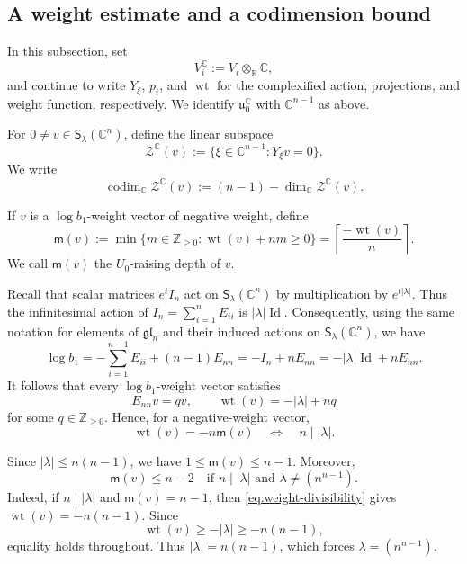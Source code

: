 \documentclass[reqno,11pt]{amsart}
\numberwithin{equation}{section}
\theoremstyle{definition}
\theoremstyle{remark}
\begin{document}
\subsection{A weight estimate and a codimension bound}
\label{s:parabolic-codim}
In this subsection, set
\[
V_i^{\mathbb C}:=V_i\otimes_{\mathbb R}\mathbb C,
\]
and continue to write $Y_\xi$, $p_i$, and $\operatorname{wt}$ for the
complexified action, projections, and weight function, respectively.
We identify
$\mathfrak u_0^{\mathbb C}$ with $\mathbb C^{n-1}$ as above.

For $0\ne v\in\mathsf S_\lambda(\mathbb C^n)$, define the linear
subspace
$$
\mathcal Z^{\mathbb C}(v)
:=
\{\xi\in\mathbb C^{n-1}:Y_\xi v=0\}.
$$
We write
$$
\operatorname{codim}_{\mathbb C}\mathcal Z^{\mathbb C}(v)
:=
(n-1)-\dim_{\mathbb C}\mathcal Z^{\mathbb C}(v).
$$

If $v$ is a $\log b_1$-weight vector of negative weight, define
\begin{equation}\label{eq:def-mv}
\mathsf m(v)
:=
\min\bigl\{m\in\mathbb Z_{\ge0}:
\operatorname{wt}(v)+nm\ge0\bigr\}
=
\left\lceil\frac{-\operatorname{wt}(v)}{n}\right\rceil.
\end{equation}
We call $\mathsf m(v)$ the $U_0$-raising depth of $v$.

Recall that scalar matrices $e^tI_n$ act on
$\mathsf S_\lambda(\mathbb C^n)$ by multiplication by
$e^{t|\lambda|}$. Thus the infinitesimal action of
$I_n=\sum_{i=1}^nE_{ii}
$
is $|\lambda|\operatorname{Id}$. Consequently, using the same notation
for elements of $\mathfrak{gl}_n$ and their induced actions on
$\mathsf S_\lambda(\mathbb C^n)$, we have
$$
\log b_1
=
-\sum_{i=1}^{n-1}E_{ii}+(n-1)E_{nn}
= -I_n + n E_{nn}=
-|\lambda|\operatorname{Id}+nE_{nn}.
$$
It follows that every $\log b_1$-weight vector satisfies
$$
E_{nn}v=qv,
\qquad
\operatorname{wt}(v)=-|\lambda|+nq
$$
for some $q\in\mathbb Z_{\ge0}$. Hence, for a negative-weight vector,
\begin{equation}\label{eq:weight-divisibility}
\operatorname{wt}(v)=-n\mathsf m(v)
\quad\Longleftrightarrow\quad
n\mid|\lambda|.
\end{equation}

Since $|\lambda|\le n(n-1)$, we have
$1\le\mathsf m(v)\le n-1$.
Moreover,
\begin{equation}\label{mv}
\mathsf m(v)\le n-2
\quad\text{if }n\mid|\lambda|
\text{ and }\lambda\ne(n^{n-1}).
\end{equation}
Indeed, if $n\mid|\lambda|$ and $\mathsf m(v)=n-1$, then
\eqref{eq:weight-divisibility} gives
$
\operatorname{wt}(v)=-n(n-1).
$
Since
$$
\operatorname{wt}(v)\ge-|\lambda|\ge-n(n-1),
$$
equality holds throughout. Thus $|\lambda|=n(n-1)$, which forces
$\lambda=(n^{n-1})$.
\end{document}
